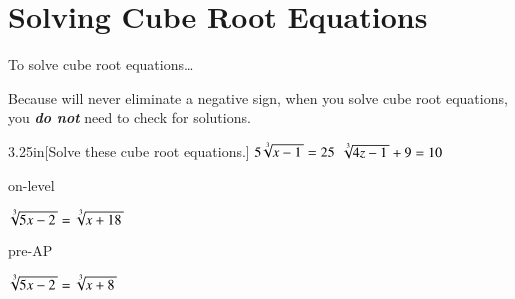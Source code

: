 \section{Solving Cube Root Equations}

\begin{myConceptSteps}{To solve cube root equations\dots}
\end{myConceptSteps}

\begin{myCenteredBox}[width=5.75in]
    \large
    Because  will never eliminate a negative sign,
    when you solve cube root equations,
    you {\bfseries\itshape do not} need to check for  solutions.
\end{myCenteredBox}


\begin{my2Problems}[\large]{3.25in}[Solve these cube root equations.]
    {
        $ 5 \myRoot[3]{x-1} = 25 $
    }
    {
        $ \myRoot[3]{4z-1} + 9 = 10 $
    }
\end{my2Problems}

\begin{taggedblock}{on-level}
    \begin{myProblem}[\large]{3.25in}
        {
            $ \myRoot[3]{5x-2}  = \myRoot[3]{x+18} $
        }
    \end{myProblem}
\end{taggedblock}

\begin{taggedblock}{pre-AP}
    \begin{myProblem}[\large]{3.25in}
        {
            $ \myRoot[3]{5x-2}  = \myRoot[3]{x+8} $
        }
    \end{myProblem}
\end{taggedblock}
